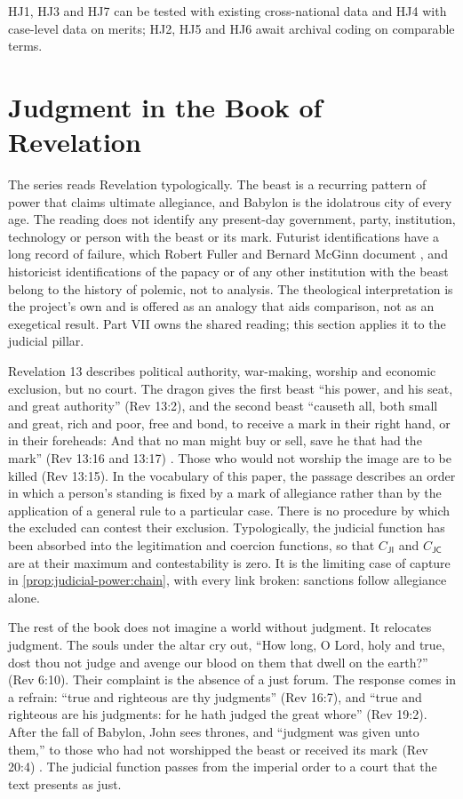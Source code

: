 \documentclass[11pt,letterpaper]{article}
\theoremstyle{definition}
\theoremstyle{remark}
\newcommand{\pJ}{\mathsf{J}}
\newcommand{\pI}{\mathsf{I}}
\newcommand{\pC}{\mathsf{C}}
\begin{document}
HJ1, HJ3 and HJ7 can be tested with existing cross-national data and HJ4 with case-level data on merits; HJ2, HJ5 and HJ6 await archival coding on comparable terms.

\section{Judgment in the Book of Revelation}
\label{sec:revelation}

The series reads Revelation typologically. The beast is a recurring pattern of power that claims ultimate allegiance, and Babylon is the idolatrous city of every age. The reading does not identify any present-day government, party, institution, technology or person with the beast or its mark. Futurist identifications have a long record of failure, which Robert Fuller and Bernard McGinn document \citep{fuller1995,mcginn1994}, and historicist identifications of the papacy or of any other institution with the beast belong to the history of polemic, not to analysis. The theological interpretation is the project's own and is offered as an analogy that aids comparison, not as an exegetical result. Part VII owns the shared reading; this section applies it to the judicial pillar.

Revelation 13 describes political authority, war-making, worship and economic exclusion, but no court. The dragon gives the first beast ``his power, and his seat, and great authority'' (Rev 13:2), and the second beast ``causeth all, both small and great, rich and poor, free and bond, to receive a mark in their right hand, or in their foreheads: And that no man might buy or sell, save he that had the mark'' (Rev 13:16 and 13:17) \citep{kjv}. Those who would not worship the image are to be killed (Rev 13:15). In the vocabulary of this paper, the passage describes an order in which a person's standing is fixed by a mark of allegiance rather than by the application of a general rule to a particular case. There is no procedure by which the excluded can contest their exclusion. Typologically, the judicial function has been absorbed into the legitimation and coercion functions, so that $C_{\pJ\pI}$ and $C_{\pJ\pC}$ are at their maximum and contestability is zero. It is the limiting case of capture in \cref{prop:judicial-power:chain}, with every link broken: sanctions follow allegiance alone.

The rest of the book does not imagine a world without judgment. It relocates judgment. The souls under the altar cry out, ``How long, O Lord, holy and true, dost thou not judge and avenge our blood on them that dwell on the earth?'' (Rev 6:10). Their complaint is the absence of a just forum. The response comes in a refrain: ``true and righteous are thy judgments'' (Rev 16:7), and ``true and righteous are his judgments: for he hath judged the great whore'' (Rev 19:2). After the fall of Babylon, John sees thrones, and ``judgment was given unto them,'' to those who had not worshipped the beast or received its mark (Rev 20:4) \citep{kjv}. The judicial function passes from the imperial order to a court that the text presents as just.
\end{document}
